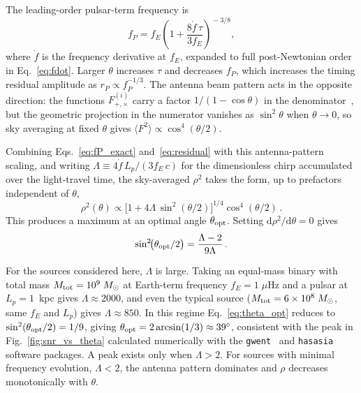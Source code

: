 \documentclass[aps,prx,twocolumn,superscriptaddress,nofootinbib,longbibliography]{revtex4-2}
\newcommand{\Msun}{M_\odot}
\begin{document}
The leading-order pulsar-term frequency is
\begin{equation}\label{eq:fP_exact}
 f_P = f_E\!\left(1 + \frac{8\dot{f}\,\tau}{3f_E}\right)^{\!-3/8},
\end{equation}
where $\dot{f}$ is the frequency derivative at $f_E$, expanded to full post-Newtonian order in Eq.~\eqref{eq:fdot}. Larger $\theta$ increases $\tau$ and decreases $f_P$, which increases the timing residual amplitude as $r_P \propto f_P^{-1/3}$. The antenna beam pattern acts in the opposite direction: the functions $F_{+,\times}^{(i)}$ carry a factor $1/(1 - \cos\theta)$ in the denominator~\cite{Mingarelli2012}, but the geometric projection in the numerator vanishes as $\sin^2\theta$ when $\theta \to 0$, so sky averaging at fixed $\theta$ gives $\langle F^2 \rangle \propto \cos^4(\theta/2)$.

Combining Eqs.~\eqref{eq:fP_exact} and~\eqref{eq:residual} with this antenna-pattern scaling, and writing $\Lambda \equiv 4\dot{f}\,L_p/(3 f_E\,c)$ for the dimensionless chirp accumulated over the light-travel time, the sky-averaged $\rho^2$ takes the form, up to prefactors independent of $\theta$,
\begin{equation}\label{eq:snr_theta}
  \rho^2(\theta) \propto
  \bigl[1 + 4\Lambda\,\sin^2(\theta/2)\bigr]^{1/4}
  \cos^4(\theta/2)\,.
\end{equation}
This produces a maximum at an optimal angle $\theta_{\rm opt}$. Setting $\mathrm{d}\rho^2/\mathrm{d}\theta = 0$ gives
\begin{equation}\label{eq:theta_opt}
  \sin^2\!\bigl(\theta_{\rm opt}/2\bigr)
 = \frac{\Lambda - 2}{9\Lambda}\,.
\end{equation}

For the sources considered here, $\Lambda$ is large. Taking an equal-mass binary with total mass $M_{\rm tot} = 10^9\;\Msun$ at Earth-term frequency $f_E = 1\;\mu$Hz and a pulsar at $L_p = 1$~kpc gives $\Lambda \approx 2000$, and even the typical source ($M_{\rm tot} = 6\times10^8\;\Msun$, same $f_E$ and $L_p$) gives $\Lambda \approx 850$. In this regime Eq.~\eqref{eq:theta_opt} reduces to $\sin^2(\theta_{\rm opt}/2) = 1/9$, giving $\theta_{\rm opt} = 2\arcsin(1/3) \approx 39^\circ$, consistent with the peak in Fig.~\ref{fig:snr_vs_theta} calculated numerically with the \texttt{gwent}~\cite{Kaiser2021} and \texttt{hasasia}~\cite{HazbounRS2019,Hazboun2019hasasia} software packages. A peak exists only when $\Lambda > 2$. For sources with minimal frequency evolution, $\Lambda < 2$, the antenna pattern dominates and $\rho$ decreases monotonically with $\theta$.
\end{document}
